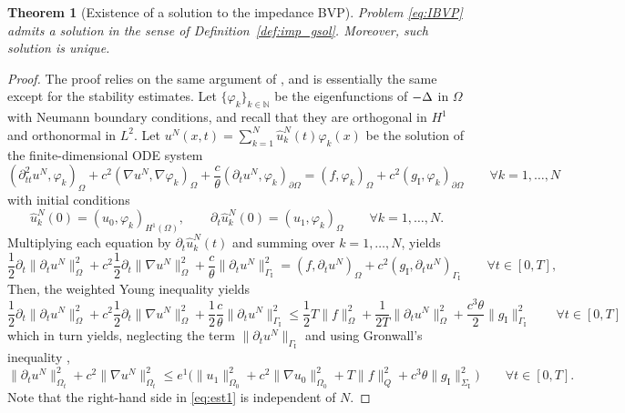 \documentclass[a4paper]{article}
\theoremstyle{plain}
\newtheorem{theorem}{Theorem}[section]
\theoremstyle{definition}
\newcommand{\Grad}[1]{\nabla #1}
\newcommand{\Lap}[1]{\Delta #1}
\newcommand{\TimeDer}{{\partial^{}_t}}
\newcommand{\SecondTimeDer}{{\partial^2_{tt}}}
\newcommand{\N}{\mathbb{N}}
\newcommand{\GI}{{\Gamma_{\mathrm I}}}
\newcommand{\SI}{{\Sigma_{\mathrm I}}}
\newcommand{\gI}{{g_{\mathrm I}}}
\newcommand{\deO}{{\partial\Omega}}
\newcommand{\OZ}{{\Omega_0}}
\begin{document}
\begin{theorem}[Existence of a solution to the impedance BVP]\label{thm:Existence}
	Problem \eqref{eq:IBVP} admits a solution in the sense of Definition~\ref{def:imp_gsol}. Moreover, such solution is unique.
\end{theorem}
\begin{proof}
	The proof relies on the same argument of \cite[Thm.~IV.3.2]{ladyzhenskaya-bvp}, and is essentially the same except for the stability estimates.
	Let $\{\varphi_k\}_{k\in\N}$ be the eigenfunctions of $-\Lap$ in $\Omega$ with Neumann boundary conditions, and recall that they are orthogonal in $H^1$ and orthonormal in $L^2$. Let $u^N(x, t) = \sum_{k=1}^N \hat{u}_k^N(t)\varphi_k(x)$ be the solution of the finite-dimensional ODE system \begin{equation}
		\label{eq:Ngalerkin}
		(\SecondTimeDer u^N, \varphi_k)_\Omega + c^2 (\Grad u^N, \Grad \varphi_k)_\Omega + \frac{c}{\theta}(\TimeDer u^N, \varphi_k)_{\deO}
		= (f, \varphi_k)_\Omega + c^2 (\gI, \varphi_k)_{\deO} \qquad \forall k=1, \dots, N
	\end{equation}
	with initial conditions
	\begin{equation*}
		\hat{u}_k^N(0) = (u_0, \varphi_k)_{H^1(\Omega)}, \qquad \TimeDer \hat{u}_k^N(0) = (u_1, \varphi_k)_\Omega \qquad \forall k = 1,\dots,N.
	\end{equation*}
Multiplying each equation by $\TimeDer \hat{u}_k^N(t)$ and summing over $k = 1, \dots, N$, yields
	\begin{equation*}
		\frac12 \TimeDer \|\TimeDer u^N\|^2_\Omega + c^2 \frac12 \TimeDer \|\Grad u^N\|^2_\Omega + \frac{c}{\theta}\|\TimeDer u^N\|^2_{\GI} = (f, \TimeDer u^N)_\Omega + c^2 (\gI, \TimeDer u^N)_{\GI} \qquad \forall t\in[0,T],
	\end{equation*}
Then, the weighted Young inequality yields
	\begin{equation}
		\label{eq:est0}
		\frac12 \TimeDer \|\TimeDer u^N\|^2_\Omega + c^2 \frac12 \TimeDer \|\Grad u^N\|^2_\Omega +\frac12\frac{c}{\theta}\|\TimeDer u^N\|^2_{\GI}
		\le \frac12 T\|f\|^2_\Omega
		+\frac1{2 T}\|\TimeDer u^N\|^2_\Omega
		+\frac{c^3\theta}2 \|\gI\|^2_\GI
		\qquad \forall t \in [0, T]
	\end{equation}
	which in turn yields, neglecting the term $\|\TimeDer u^N\|_\GI$ and using Gronwall's inequality \cite[sect.~B.2.j]{EvansPDE},
\begin{equation}\label{eq:est1}
\|\TimeDer u^{ N}\|_{\Omega_t}^2 +  c^2\|\Grad u^{ N}\|_{\Omega_t}^2\le
e^1\big(\|u_1\|_\OZ^2+c^2\|\Grad u_0\|_\OZ^2+ T\|f\|_Q^2+c^3\theta\|\gI\|_\SI^2\big)\qquad\forall t \in[0,T].
\end{equation}
Note that the right-hand side in \eqref{eq:est1} is independent of $N$.


\end{proof}
\end{document}
